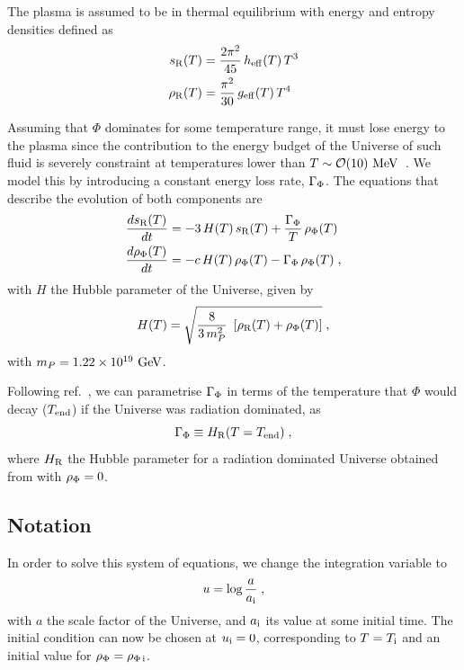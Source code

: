 \documentclass[11pt,a4paper]{article}
\begin{document}
The plasma is assumed to be in thermal equilibrium with energy and entropy densities defined as
%
\begin{align}
	s_{\rm R}(T)&=\dfrac{2\pi^2}{45} \,  h_{\rm eff}{}(T) \, T^3 \label{eq:s_def}\\
	\rho_{\rm R}(T)&=\dfrac{\pi^2}{30} \,  g_{\rm eff}{}(T) \, T^4 \label{eq:rho_def}
\end{align}
%


Assuming that $\Phi$ dominates for some temperature range, it must lose energy to the plasma since the contribution to the energy budget of the Universe of such fluid is severely constraint at temperatures lower than $T \sim \mathcal{O}(10)~{\rm MeV}$~\cite{Allahverdi:2020bys}. We model this by introducing a constant energy loss rate, $\Gamma_{\Phi}$. The equations that describe the evolution of both components are
%
\begin{align}
	\dfrac{ds_{\rm R}(T)}{dt} &= -3 \, H(T)  \, s_{\rm R}(T) + \dfrac{\Gamma_{\Phi}}{T} \, \rho_{\Phi}(T) \label{eq:dsdt} \\ 
	\dfrac{d\rho_{\Phi}(T)}{dt} &= - c \, H(T) \, \rho_{\Phi}(T) - \Gamma_{\Phi} \, \rho_{\Phi}(T) \label{eq:drhoPhidt} \;,
\end{align}
%
with $H$ the Hubble parameter of the Universe, given by
%
\begin{equation}
	H(T) = \sqrt{\dfrac{8}{3\,m_P^2} \ \left[ \rho_{\rm R}(T) + \rho_{\Phi}(T) \right]}\;,
	\label{eq:H_def}
\end{equation}
%
with $m_P = 1.22 \times 10^{19}~{\rm GeV}$.
 

Following ref.~\cite{Arias:2020qty}, we can parametrise $\Gamma_{\Phi}$ in terms of the temperature that $\Phi$ would decay ($T_{\rm end}{}$) if the Universe was radiation dominated, as
%
\begin{equation}
	\Gamma_{\Phi} \equiv H_{\rm R}(T=T_{\rm end}{})\;,
	\label{eq:Tend_def}
\end{equation}
%
where $H_{\rm R}$ the Hubble parameter for a radiation dominated Universe obtained from  with $\rho_{\Phi}=0$.


\subsection{Notation}\label{sec:notation}

In order to solve this system of equations, we change the integration variable to 
%
\begin{equation}
	u=\log\frac{a}{a_{\rm i}{}}\;,	
	\label{eq:u_def}
\end{equation}
%
with $a$ the scale factor of the Universe, and $a_{\rm i}{}$ its value at some initial time. The initial condition can now be chosen at $u_{\rm i}{}=0$, corresponding to $T=T_{\rm i}{}$ and an initial value for $\rho_{\Phi}=\rho_{\Phi\,{\rm i}}$. 
\end{document}
